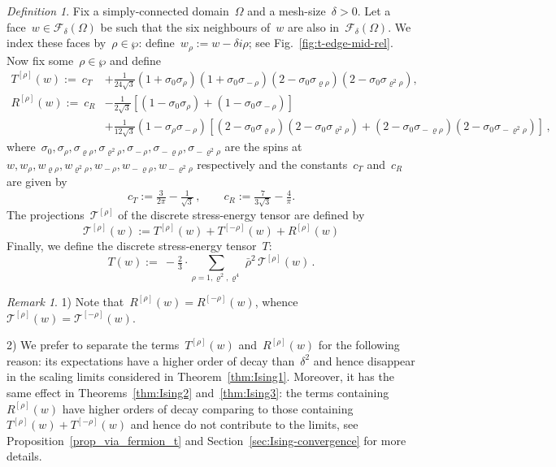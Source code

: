 \documentclass[reqno,11pt,a4paper]{amsart}
\theoremstyle{remark}
\newtheorem{definition}[proposition]{Definition}
\newtheorem{remark}[proposition]{Remark}
\newcommand{\Faces}{\mathcal{F}}
\newcommand{\CmT}{c_T}
\newcommand{\CmR}{c_R}
\newcommand{\Trho}{T^{[\rho]}}
\newcommand{\Rrho}{R^{[\rho]}}
\newcommand{\Tmrho}{T^{\left[-\rho \right]}}
\newcommand{\Rmrho}{R^{\left[-\rho \right]}}
\newcommand{\weOne}{w_{\rho}}
\newcommand{\weTwo}{w_{\varrho\rho}}
\newcommand{\weThree}{w_{\varrho^2\rho}}
\newcommand{\weFour}{w_{\!-\rho}}
\newcommand{\weFive}{w_{\!-\varrho\rho}}
\newcommand{\weSix}{w_{\!-\varrho^2\rho}}
\newcommand{\seOne}{\sigma_{\rho}}
\newcommand{\seTwo}{\sigma_{\varrho\rho}}
\newcommand{\seThree}{\sigma_{\varrho^2\rho}}
\newcommand{\seFour}{\sigma_{\!-\rho}}
\newcommand{\seFive}{\sigma_{\!-\varrho\rho}}
\newcommand{\seSix}{\sigma_{\!-\varrho^2\rho}}
\begin{document}
\begin{definition}\label{def:T-via-spins}
	Fix a simply-connected domain~$\Omega$ and a mesh-size~$\delta>0$.
	Let a face~$w\in\Faces_\delta(\Omega)$ be such that the six neighbours of~$w$ are also in~$\Faces_\delta(\Omega)$.
	We index these faces by~$\rho\in\wp$: define~$\weOne:=w - \delta i \rho$; see Fig.~\ref{fig:t-edge-mid-rel}.
	Now fix some~$\rho\in\wp$ and define
	\begin{align*}
		\Trho(w):=   ~\CmT  & + {\textstyle\frac{1}{24\sqrt{3}}}(1\!+\!\sigma_0\seOne)(1\!+\!\sigma_0\seFour)(2\!-\!\sigma_0\seTwo)(2\!-\!\sigma_0\seThree),
		\\
		\Rrho(w) := ~\CmR & - {\textstyle\frac{1}{2\sqrt{3}}}[(1\!-\!\sigma_0\seOne)+(1\!-\!\sigma_0\seFour)]\\
		& + {\textstyle\frac{1}{12\sqrt{3}}}(1\!-\!\seOne\seFour)[(2\!-\!\sigma_0\seTwo)(2\!-\!\sigma_0\seThree)+(2\!-\!\sigma_0\seFive)(2\!-\!\sigma_0\seSix)]\,,
	\end{align*}
	where~$\sigma_0, \seOne, \seTwo, \seThree, \seFour, \seFive, \seSix$ are the spins at~$w, \weOne, \weTwo, \weThree, \weFour, \weFive, \weSix$ respectively and the constants~$\CmT$ and~$\CmR$ are given by
	\begin{equation}
		\label{eq:CmTCmRCmid=}
		\CmT:=\tfrac{3}{2\pi}\! - \!\tfrac{1}{\sqrt{3}}\,,\qquad\CmR:=\tfrac{7}{3\sqrt{3}}\! - \!\tfrac{4}{\pi}.
	\end{equation}
	The projections~$\mathcal{T}^{[\rho]}$ of the discrete stress-energy tensor are defined by
	\[
		\mathcal{T}^{[\rho]}(w):=\Trho(w)+\Tmrho(w)+\Rrho(w)
	\]
	Finally, we define the discrete stress-energy tensor~$T$:
	\[
		T(w) :=~ -\tfrac{2}{3}\cdot \sum_{\rho=1,\varrho^2,\varrho^4}\,\bar{\rho}^2 \,\mathcal{T}^{[\rho]}(w) \,.
	\]
\end{definition}

\begin{remark} \label{rem:T-and-R}
	1) Note that~$\Rrho(w)=\Rmrho(w)$, whence~$\mathcal{T}^{[\rho]}(w) = \mathcal{T}^{[-\rho]}(w)$.
	
	2) We prefer to separate the terms~$\Trho(w)$ and~$\Rrho(w)$ for the following reason: its expectations have a higher order of decay than~$\delta^2$ and hence disappear in the scaling limits considered in Theorem~\ref{thm:Ising1}. Moreover, it has the same effect in Theorems~\ref{thm:Ising2} and~\ref{thm:Ising3}: the terms containing~$\Rrho(w)$ have higher orders of decay comparing to those containing~$\Trho(w)+\Tmrho(w)$ and hence do not contribute to the limits, see Proposition~\ref{prop_via_fermion_t} and Section~\ref{sec:Ising-convergence} for more details.
\end{remark}
\end{document}
